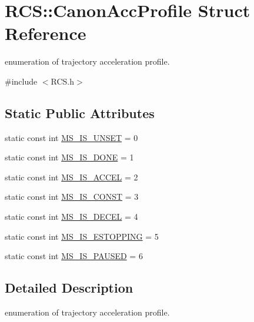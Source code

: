 \hypertarget{structRCS_1_1CanonAccProfile}{\section{R\-C\-S\-:\-:Canon\-Acc\-Profile Struct Reference}
\label{structRCS_1_1CanonAccProfile}
}


enumeration of trajectory acceleration profile.  




{\ttfamily \#include $<$R\-C\-S.\-h$>$}

\subsection*{Static Public Attributes}
\begin{DoxyCompactItemize}
\item 
static const int \hyperlink{structRCS_1_1CanonAccProfile_a4c8249dfd6aaf09367d2abf3a2c6f54e}{M\-S\-\_\-\-I\-S\-\_\-\-U\-N\-S\-E\-T} = 0
\item 
static const int \hyperlink{structRCS_1_1CanonAccProfile_a24163f7b52c122d7329acb7f848c5587}{M\-S\-\_\-\-I\-S\-\_\-\-D\-O\-N\-E} = 1
\item 
static const int \hyperlink{structRCS_1_1CanonAccProfile_ada8d9c411cbff5e10fb811a994f390ba}{M\-S\-\_\-\-I\-S\-\_\-\-A\-C\-C\-E\-L} = 2
\item 
static const int \hyperlink{structRCS_1_1CanonAccProfile_a38dff6ea9c20f5798ef873747cdd9a7f}{M\-S\-\_\-\-I\-S\-\_\-\-C\-O\-N\-S\-T} = 3
\item 
static const int \hyperlink{structRCS_1_1CanonAccProfile_ac58e66a5af8c68f4c1da483da6c35166}{M\-S\-\_\-\-I\-S\-\_\-\-D\-E\-C\-E\-L} = 4
\item 
static const int \hyperlink{structRCS_1_1CanonAccProfile_a666610a5efde57705413ef2dd65e1fb4}{M\-S\-\_\-\-I\-S\-\_\-\-E\-S\-T\-O\-P\-P\-I\-N\-G} = 5
\item 
static const int \hyperlink{structRCS_1_1CanonAccProfile_a83cd5d24039e517647d72a6a9c82afe3}{M\-S\-\_\-\-I\-S\-\_\-\-P\-A\-U\-S\-E\-D} = 6
\end{DoxyCompactItemize}


\subsection{Detailed Description}
enumeration of trajectory acceleration profile. 

